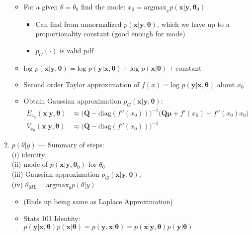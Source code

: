 \documentclass{article}
\begin{document}
\begin{enumerate}
\citep{Lindstrom2014}
      \begin{itemize}
      \item For a given $\theta = \theta_{0}$ find the mode: $x_{0} = \text{argmax}_{x}p(\pmb{x}|\pmb{y},\pmb{\theta}_{0})$
                \begin{itemize}
                \item Can find from unnormalized $p(\pmb{x} | \pmb{y}, \pmb{\theta})$, which we have up to a proportionality constant (good enough for mode)
                \item $p_{G}(\cdot)$ is valid pdf
                \end{itemize}
      \item $\text{log } p(\pmb{x} | \pmb{y}, \pmb{\theta}) = \text{log } p(\pmb{y} | \pmb{x}, \pmb{\theta}) + \text{log } p(\pmb{x} | \pmb{\theta}) + \text{constant}$
      \item Second order Taylor approximation of $f(x) = \text{log } p(\pmb{y} | \pmb{x}, \pmb{\theta})$ about $x_{0}$
      \item Obtain Gaussian approximation $p_{G}(\pmb{x} | \pmb{y}, \pmb{\theta})$:
            \begin{align}
            E_{x_{0}}(\pmb{x|y,\theta}) & \approx \big( \pmb{Q} - \text{diag}(f''(x_{0})) \big)^{-1} \big( \pmb{Q\mu} + f'(x_{0}) - f''(x_{0})x_{0} \big)  \\
            V_{x_{0}}(\pmb{x|y,\theta}) & \approx \big( \pmb{Q} - \text{diag}(f''(x_{0})) \big)^{-1}
            \end{align}
      \end{itemize}

\item $p(\theta|y)$ --- Summary of steps: \\

(i) identity \\
(ii) mode of $p(\pmb{x}|\pmb{y},\pmb{\theta}_{0})$ for $\theta_{0}$ \\
(iii) Gaussian approximation $p_{G}(\pmb{x} | \pmb{y}, \pmb{\theta})$, \\
(iv) $\theta_{ML} = \text{argmax}_{\theta} p(\theta|y)$

      \begin{itemize}
      \item (Ends up being same as \cite{Tierney1986} Laplace Approximation)
      \item Stats 101 Identity: $p(\pmb{y} | \pmb{x}, \pmb{\theta}) p(\pmb{x} | \pmb{\theta}) =
p(\pmb{y} , \pmb{x} | \pmb{\theta}) = p(\pmb{x} | \pmb{y}, \pmb{\theta}) p(\pmb{y} | \pmb{\theta})$


\end{itemize}
\end{enumerate}
\end{document}
